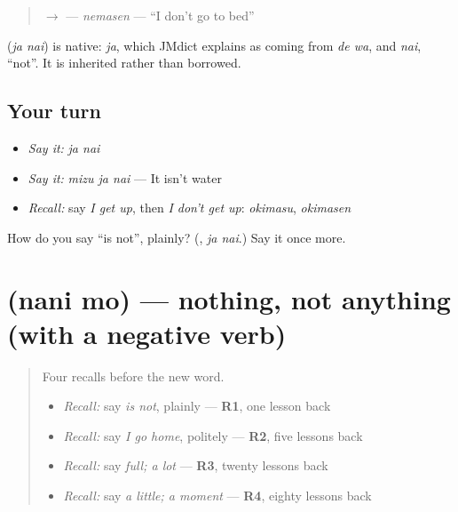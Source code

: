 \begin{quote}
\textbf{} $\to$ \textbf{} — \emph{nemasen} — \textquotedblleft{}I don't go to bed\textquotedblright{}
\end{quote}

\begin{cousinweb}
\textbf{} (\emph{ja nai}) is native: \emph{ja}, which JMdict explains as coming from \emph{de wa}, and \emph{nai}, \textquotedblleft{}not\textquotedblright{}. It is inherited rather than borrowed.
\end{cousinweb}

\subsection*{Your turn}
\begin{itemize}
\raggedright
  \item \emph{Say it:} \emph{ja nai}
  \item \emph{Say it:} \emph{mizu ja nai} — It isn't water
  \item \emph{Recall:} say \emph{I get up}, then \emph{I don't get up}: \emph{okimasu}, \emph{okimasen}
\end{itemize}

\begin{tcolorbox}[breakable,colback=teal!4,colframe=teal!35!black,title={Before you move on}]
How do you say \textquotedblleft{}is not\textquotedblright{}, plainly? (\textbf{}, \emph{ja nai}.) Say it once more.
\end{tcolorbox}
\section[\texorpdfstring{\ja{なにも} (nani mo)}{なにも (nani mo)}]{ (nani mo) — nothing, not anything (with a negative verb)}

\label{lesson:JA-C139-nanimo}



\begin{quote}
Four recalls before the new word.

\begin{itemize}
\raggedright
  \item \emph{Recall:} say \emph{is not}, plainly — \textbf{R1}, one lesson back
  \item \emph{Recall:} say \emph{I go home}, politely — \textbf{R2}, five lessons back
  \item \emph{Recall:} say \emph{full; a lot} — \textbf{R3}, twenty lessons back
  \item \emph{Recall:} say \emph{a little; a moment} — \textbf{R4}, eighty lessons back
\end{itemize}
\end{quote}

